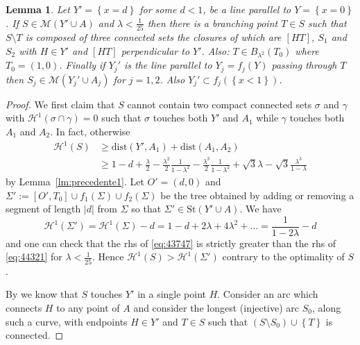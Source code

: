 \documentclass{article}
\renewcommand{\H}{\mathcal H}
\newcommand{\abs}[1]{\left\vert #1 \right\vert}
\newcommand{\ENCLOSE}[1]{\left\{#1\right\}}
\newcommand{\St}{\mathrm{St}}
\newcommand{\M}{\mathcal{M}}
\renewcommand{\H}{\mathcal{H}}
\newcommand{\dist}{\mathrm{dist}}
\newtheorem{lemma}[theorem]{Lemma}
\theoremstyle{definition}
\theoremstyle{remark}
\begin{document}
\begin{lemma}\label{lm:branching}
  Let $Y'=\ENCLOSE{x=d}$ for some $d<1$,
  be a line parallel to $Y=\ENCLOSE{x=0}$.
  If $S\in \M(Y'\cup A)$
  and $\lambda < \frac 1 {25}$ then
  there is a branching point $T\in S$ 
  such that $S\setminus T$ is composed of 
  three connected sets the closures of which are
   $[HT]$, $S_1$ and $S_2$ 
  with $H\in Y'$ and $[HT]$ perpendicular to $Y'$.  
  Also: $T\in B_{\lambda^2}(T_0)$ where $T_0=(1,0)$.
  Finally if $Y_j'$ is the line parallel to $Y_j=f_j(Y)$ 
  passing through $T$ 
  then $S_j \in \M(Y_j'\cup A_j)$ for $j=1,2$.
  Also $Y_j'\subset f_j(\ENCLOSE{x<1})$.
\end{lemma}
\begin{proof}
  We first claim that $S$ cannot contain 
  two compact connected sets 
  $\sigma$ and $\gamma$
  with $\H^1(\sigma\cap \gamma)=0$
  such that $\sigma$ touches both $Y'$ and $A_1$ 
  while $\gamma$ touches both $A_1$ and $A_2$.
  In fact, otherwise
  \begin{equation}
  \label{eq:43747}
  \begin{aligned}
    \H^1(S)
    &\ge \dist(Y', A_1) + \dist(A_1, A_2)
    \\
    &\ge 
    1 - d + \frac{\lambda} 2 
      - \frac{\lambda^2}{2}\frac{1}{1-\lambda^2}
      - \frac{\lambda^3}{2}\frac{1}{1-\lambda^2} 
     +
     \sqrt 3 \lambda - \sqrt 3 \frac{\lambda^3}{1-\lambda}
  \end{aligned}
  \end{equation}
  by Lemma~\ref{lm:precedente1}.
  Let $O'=(d,0)$ and $\Sigma':=[O',T_0] \cup f_1(\Sigma) \cup f_2(\Sigma)$ 
  be the tree obtained by adding or removing a segment of length 
  $\abs{d}$ from $\Sigma$ so that $\Sigma'\in \St(Y'\cup A)$.
  We have  
  \begin{equation}\label{eq:44321}
    \H^1(\Sigma')
    = \H^1(\Sigma) - d 
    = 1 - d + 2 \lambda + 4 \lambda^2 + \dots 
    = \frac{1}{1-2\lambda}-d
  \end{equation}
  and one can check that the rhs of \eqref{eq:43747} is
  strictly greater than the rhs of \eqref{eq:44321}
  for $\lambda < \frac 1 {25}$.
  Hence $\H^1(S) > \H^1(\Sigma')$ contrary 
  to the optimality of $S$.
  
  By \cite{PaoSte} we know that $S$ touches $Y'$ in a single point $H$.
  Consider an arc which connects $H$ to any point of $A$
  and consider the longest (injective) arc $S_0$, along such a curve,
  with endpoints $H\in Y'$ and $T\in S$
  such that $(S\setminus S_0) \cup \ENCLOSE{T}$ is connected.
  

\end{proof}
\end{document}
